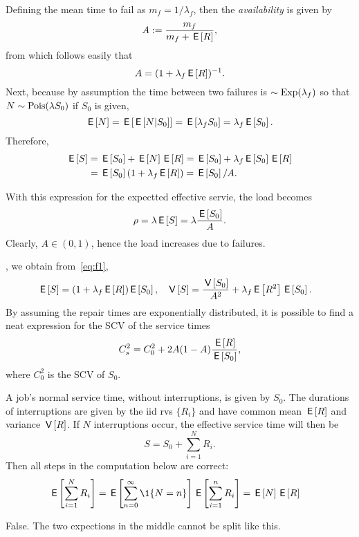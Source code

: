 \documentclass[stochastic-or.tex]{subfiles}
\begin{document}
Defining the mean time to fail as $m_{f} = 1/\lambda_f$, then the  \emph{availability} is given by
\begin{equation*}
 A:=\frac{m_f}{m_f + \,\mathsf{E}\left[R\right]},
\end{equation*}
from which follows  easily that
\begin{equation}\label{eq:91}
A=(1+\lambda_f \,\mathsf{E}\left[R\right])^{-1}.
\end{equation}
Next, because by assumption the time between two failures is $\sim \mathrm{Exp}(\lambda_{f})$ so that $N\sim \mathrm{Pois}(\lambda S_{0})$ if $S_{0}$ is given,
\begin{equation}
\label{eq:38}
\,\mathsf{E}\left[N\right] = \,\mathsf{E}\left[\,\mathsf{E}\left[N|S_{0}\right]\right] = \,\mathsf{E}\left[\lambda_{f}S_{0}\right] = \lambda_{f} \,\mathsf{E}\left[S_{0}\right].
\end{equation}
Therefore,
 \begin{align*}
   \,\mathsf{E}\left[S\right] &= \,\mathsf{E}\left[S_0\right] + \,\mathsf{E}\left[N\right] \,\mathsf{E}\left[R\right] = \,\mathsf{E}\left[S_0\right] + \lambda_f \,\mathsf{E}\left[S_0\right] \,\mathsf{E}\left[R\right] \\\
   &= \,\mathsf{E}\left[S_0\right](1+\lambda_f \,\mathsf{E}\left[R\right]) = \,\mathsf{E}\left[S_{0}\right]/A.
 \end{align*}

With this expression for the expectted effective servie, the load becomes
\begin{equation*}
\rho = \lambda \,\mathsf{E}\left[S\right] = \lambda \frac{\,\mathsf{E}\left[S_0\right]}A.
\end{equation*}
Clearly, $A\in (0,1)$, hence the load increases due to failures.

, we obtain from~\cref{eq:f1},
 \begin{align}\label{eq:f2}
\,\mathsf{E}\left[S\right] &= (1+\lambda_f \,\mathsf{E}\left[R\right]) \,\mathsf{E}\left[S_0\right], & \,\mathsf{V}\left[S\right] &= \frac{\,\mathsf{V}\left[S_0\right]}{A^2} + \lambda_f \,\mathsf{E}\left[R^2\right] \,\mathsf{E}\left[S_0\right].
 \end{align}
By assuming the repair times are exponentially distributed, it is possible to find a neat expression for the SCV of the service times
\begin{equation}\label{eq:f3}
 C_s^2 = C_0^2 + 2 A(1-A) \frac{\,\mathsf{E}\left[R\right]}{\,\mathsf{E}\left[S_0\right]},
\end{equation}
where $C_0^2$ is the SCV of $S_0$.

\begin{truefalse}
A job's normal service time, without interruptions, is given by $S_0$.
The durations of interruptions are given by the iid rvs $\{R_i\}$ and have common mean $\,\mathsf{E}\left[R\right]$ and variance $\,\mathsf{V}\left[R\right]$.
If $N$ interruptions occur, the effective service time will then be
\begin{equation*}
S= S_0 + \sum_{i=1}^N R_i.
\end{equation*}
Then all steps in the computation below are correct:
\begin{align*}
 \E{\sum_{i=1}^N R_i}
&= \E{ \sum_{n=0}^\infty \1{N=n}} \E{ \sum_{i=1}^n R_i } = \E N \E R
\end{align*}
\begin{solution} False. The two expections in the middle cannot be split like this.
\end{solution}
\end{truefalse}
\end{document}
